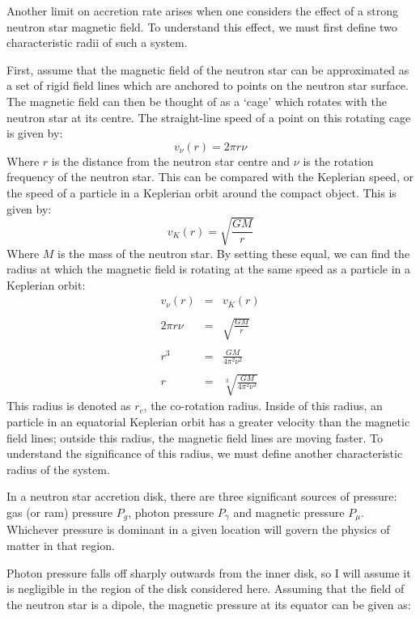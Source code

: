 \par Another limit on accretion rate arises when one considers the effect of a strong neutron star magnetic field.  To understand this effect, we must first define two characteristic radii of such a system.
\par First, assume that the magnetic field of the neutron star can be approximated as a set of rigid field lines which are anchored to points on the neutron star surface.  The magnetic field can then be thought of as a `cage' which rotates with the neutron star at its centre.  The straight-line speed of a point on this rotating cage is given by:
\begin{equation}
v_\nu(r)=2\pi r\nu
\end{equation}
Where $r$ is the distance from the neutron star centre and $\nu$ is the rotation frequency of the neutron star.  This can be compared with the Keplerian speed, or the speed of a particle in a Keplerian orbit around the compact object.  This is given by:
\begin{equation}
v_K(r)=\sqrt{\frac{GM}{r}}
\end{equation}
Where $M$ is the mass of the neutron star.  By setting these equal, we can find the radius at which the magnetic field is rotating at the same speed as a particle in a Keplerian orbit:
\begin{eqnarray}
v_\nu(r)&=&v_K(r)\\ \nonumber \\
2\pi r\nu&=&\sqrt{\frac{GM}{r}}\\ \nonumber \\
r^3&=&\frac{GM}{4\pi^2\nu^2}\\ \nonumber \\
r&=&\sqrt[3]{\frac{GM}{4\pi^2\nu^2}}
\end{eqnarray}
This radius is denoted as $r_c$, the co-rotation radius.  Inside of this radius, an particle in an equatorial Keplerian orbit has a greater velocity than the magnetic field lines; outside this radius, the magnetic field lines are moving faster.  To understand the significance of this radius, we must define another characteristic radius of the system.
\par In a neutron star accretion disk, there are three significant sources of pressure: gas (or ram) pressure $P_g$, photon pressure $P_\gamma$ and magnetic pressure $P_\mu$.  Whichever pressure is dominant in a given location will govern the physics of matter in that region.
\par Photon pressure falls off sharply outwards from the inner disk, so I will assume it is negligible in the region of the disk considered here.  Assuming that the field of the neutron star is a dipole, the magnetic pressure at its equator can be given as:
